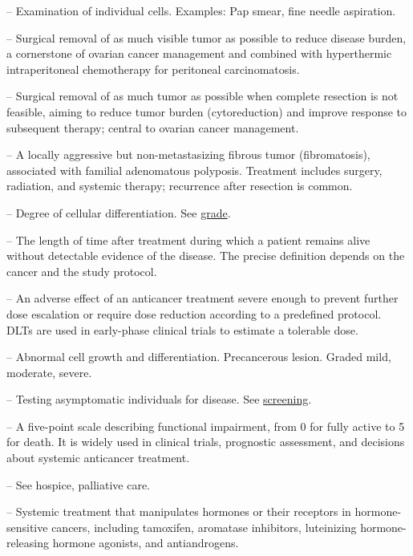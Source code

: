 -- Examination of individual cells. Examples: Pap smear, fine needle aspiration.

-- Surgical removal of as much visible tumor as possible to reduce disease burden, a cornerstone of ovarian cancer management and combined with hyperthermic intraperitoneal chemotherapy for peritoneal carcinomatosis.


-- Surgical removal of as much tumor as possible when complete resection is not feasible, aiming to reduce tumor burden (cytoreduction) and improve response to subsequent therapy; central to ovarian cancer management.

-- A locally aggressive but non-metastasizing fibrous tumor (fibromatosis), associated with familial adenomatous polyposis. Treatment includes surgery, radiation, and systemic therapy; recurrence after resection is common.

-- Degree of cellular differentiation. See \hyperlink{Grade}{grade}.

-- The length of time after treatment during which a patient remains alive without detectable evidence of the disease. The precise definition depends on the cancer and the study protocol.

-- An adverse effect of an anticancer treatment severe enough to prevent further dose escalation or require dose reduction according to a predefined protocol. DLTs are used in early-phase clinical trials to estimate a tolerable dose.

-- Abnormal cell growth and differentiation. Precancerous lesion. Graded mild, moderate, severe.

-- Testing asymptomatic individuals for disease. See \hyperlink{Screening}{screening}.

-- A five-point scale describing functional impairment, from 0 for fully active to 5 for death. It is widely used in clinical trials, prognostic assessment, and decisions about systemic anticancer treatment.

-- See hospice, palliative care.

-- Systemic treatment that manipulates hormones or their receptors in hormone-sensitive cancers, including tamoxifen, aromatase inhibitors, luteinizing hormone-releasing hormone agonists, and antiandrogens.


